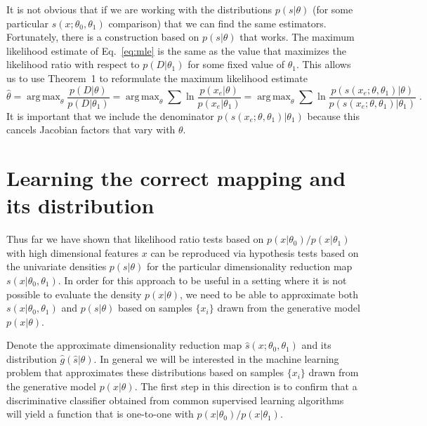 \documentclass{article} %
\DeclareMathOperator*{\argmax}{arg\,max}
\begin{document}
It is not obvious that if we are working with the distributions $p(s|\theta)$ (for some particular $s(x; \theta_0, \theta_1)$ comparison) that we can find the same estimators. 
Fortunately, there is a construction based on $p(s|\theta)$ that works. The maximum likelihood estimate of Eq.~\ref{eq:mle} is the same as the value that maximizes the likelihood ratio with respect to $p(D|\theta_1)$ for some fixed value of $\theta_1$. This allows us to use Theorem~1 to reformulate the maximum likelihood estimate
\begin{equation}
\hat{\theta} = \argmax_\theta \frac{ p(D | \theta)}{ p(D | \theta_1)} = \argmax_\theta  \sum \ln \frac{p(x_e | \theta)}{p(x_e|\theta_1)} = \argmax_\theta  \sum \ln \frac{p(s(x_e; \theta, \theta_1) | \theta)}{p(s(x_e; \theta, \theta_1) |\theta_1)} \; .
\end{equation}
It is important that we include the denominator $p(s(x_e; \theta, \theta_1) |\theta_1)$ because this cancels Jacobian factors that vary with $\theta$.

\section{Learning the correct mapping and its distribution}\label{S:classifier}

Thus far we have shown that likelihood ratio tests based on $p(x|\theta_0)/p(x|\theta_1)$ with high dimensional features $x$ can be reproduced via hypothesis tests based on the univariate densities $p(s|\theta)$ for the particular dimensionality reduction map $s(x|\theta_0, \theta_1)$.
In order for this approach to be useful in a setting where it is not possible to evaluate the density $p(x|\theta)$, we need to be able to approximate both $s(x|\theta_0, \theta_1)$ and $p(s|\theta)$ based on samples $\{x_i\}$ drawn from the generative model $p(x|\theta)$.  

Denote the approximate dimensionality reduction map $\hat{s}(x; \theta_0, \theta_1)$ and its distribution $\hat{g}(\hat{s}|\theta)$. In general we will be interested in the machine learning problem that approximates these distributions based on samples $\{x_i\}$ drawn from the generative model $p(x|\theta)$.  
The first step in this direction is to confirm that a discriminative classifier obtained from common supervised learning algorithms will yield a function that is one-to-one with $p(x|\theta_0)/p(x|\theta_1)$.
\end{document}
